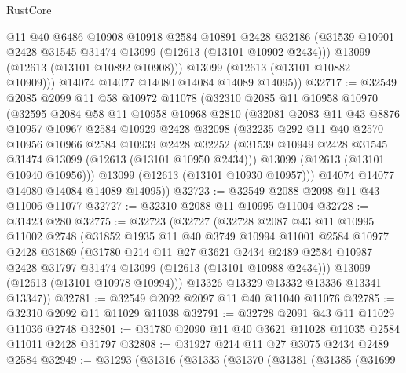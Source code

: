 \begin{lexlean}{RustCore}
\begin{coremodule}
            @11
            @40
            @6486
            @10908
            @10918
            @2584
            @10891
            @2428
            @32186
            (@31539 @10901 @2428 @31545 @31474 @13099 (@12613 (@13101 @10902 @2434)))
            @13099
            (@12613 (@13101 @10892 @10908)))
          @13099
          (@12613 (@13101 @10882 @10909)))
        @14074
        @14077
        @14080
        @14084
        @14089
        @14095))
@32717 := @32549
    @2085
    @2099
    @11
    @58
    @10972
    @11078
    (@32310
      @2085
      @11
      @10958
      @10970
      (@32595
        @2084
        @58
        @11
        @10958
        @10968
        @2810
        (@32081
          @2083
          @11
          @43
          @8876
          @10957
          @10967
          @2584
          @10929
          @2428
          @32098
          (@32235
            @292
            @11
            @40
            @2570
            @10956
            @10966
            @2584
            @10939
            @2428
            @32252
            (@31539 @10949 @2428 @31545 @31474 @13099 (@12613 (@13101 @10950 @2434)))
            @13099
            (@12613 (@13101 @10940 @10956)))
          @13099
          (@12613 (@13101 @10930 @10957)))
        @14074
        @14077
        @14080
        @14084
        @14089
        @14095))
@32723 := @32549 @2088 @2098 @11 @43 @11006 @11077
@32727 := @32310 @2088 @11 @10995 @11004
@32728 := @31423 @280
@32775 := @32723
    (@32727
      (@32728
        @2087
        @43
        @11
        @10995
        @11002
        @2748
        (@31852
          @1935
          @11
          @40
          @3749
          @10994
          @11001
          @2584
          @10977
          @2428
          @31869
          (@31780
            @214
            @11
            @27
            @3621
            @2434
            @2489
            @2584
            @10987
            @2428
            @31797
            @31474
            @13099
            (@12613 (@13101 @10988 @2434)))
          @13099
          (@12613 (@13101 @10978 @10994)))
        @13326
        @13329
        @13332
        @13336
        @13341
        @13347))
@32781 := @32549 @2092 @2097 @11 @40 @11040 @11076
@32785 := @32310 @2092 @11 @11029 @11038
@32791 := @32728 @2091 @43 @11 @11029 @11036 @2748
@32801 := @31780 @2090 @11 @40 @3621 @11028 @11035 @2584 @11011 @2428 @31797
@32808 := @31927 @214 @11 @27 @3075 @2434 @2489 @2584
@32949 := @31293
    (@31316
      (@31333
        (@31370
          (@31381
            (@31385
              (@31699

\end{coremodule}
\end{lexlean}
